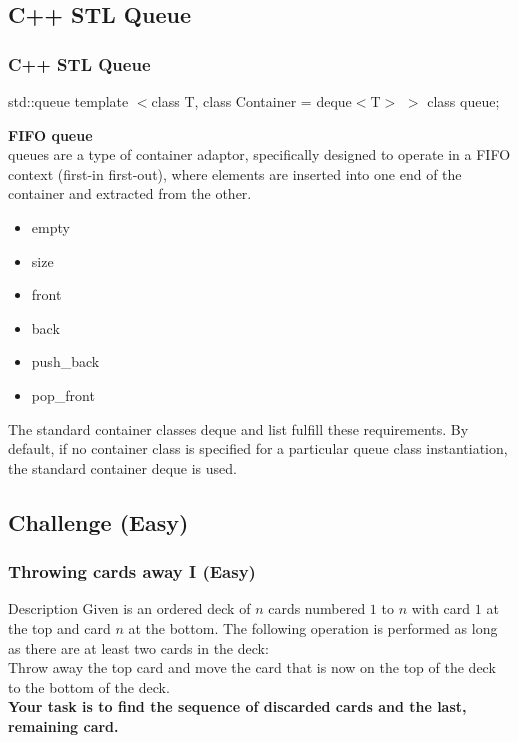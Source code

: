 \documentclass{beamer}
\begin{document}
\subsection{C++ STL Queue} 

\begin{frame}
\frametitle{C++ STL Queue}

\begin{block}{std::queue}
template $<$class T, class Container = deque$<$T$>$ $>$ class queue;
\end{block}

\textbf{FIFO queue}\\
queues are a type of container adaptor, specifically designed to operate in a FIFO context (first-in first-out), where elements are inserted into one end of the container and extracted from the other.

\begin{multicols}{2}
\begin{itemize}
	\item empty
	\item size
	\item front
	\item back
	\item push\_back
	\item pop\_front
\end{itemize}
\end{multicols}

The standard container classes deque and list fulfill these requirements. By default, if no container class is specified for a particular queue class instantiation, the standard container deque is used.

\end{frame}
\subsection{Challenge (Easy)}
\begin{frame}
\frametitle{Throwing cards away I (Easy)}

\begin{block}{Description}
Given is an ordered deck of $n$ cards numbered $1$ to $n$ with card $1$ at the top and card $n$ at the bottom. The following operation is performed as long as there are at least two cards in the deck:\\
Throw away the top card and move the card that is now on the top of the deck to the bottom of the deck.\\
\textbf{Your task is to  find the sequence of discarded
cards and the last, remaining card.}
\end{block}

\end{frame}
\end{document}
